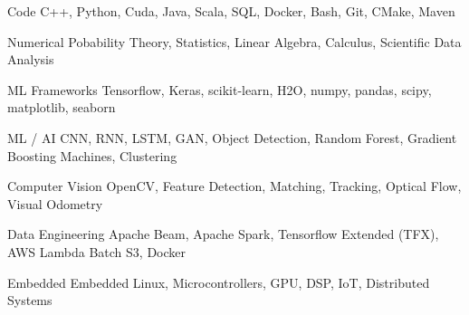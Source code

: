 

\begin{cvskills}

\cvskill
    {Code} %
    {C++, Python, Cuda, Java, Scala, SQL, Docker, Bash, Git, CMake, Maven} %

\cvskill
    {Numerical} %
    {Pobability Theory, Statistics, Linear Algebra, Calculus, Scientific Data Analysis} %


\cvskill
    {ML Frameworks} %
    {Tensorflow, Keras, scikit-learn, H2O, numpy, pandas, scipy, matplotlib, seaborn} %

\cvskill
    {ML / AI} %
    {CNN, RNN, LSTM, GAN, Object Detection, Random Forest, Gradient Boosting Machines, Clustering} %

\cvskill
    {Computer Vision} %
    {OpenCV, Feature Detection, Matching, Tracking, Optical Flow, Visual Odometry} %

\cvskill
    {Data Engineering} %
    {Apache Beam, Apache Spark, Tensorflow Extended (TFX), AWS Lambda Batch S3, Docker} %


\cvskill
    {Embedded} %
    {Embedded Linux, Microcontrollers, GPU, DSP, IoT, Distributed Systems} %

\end{cvskills}